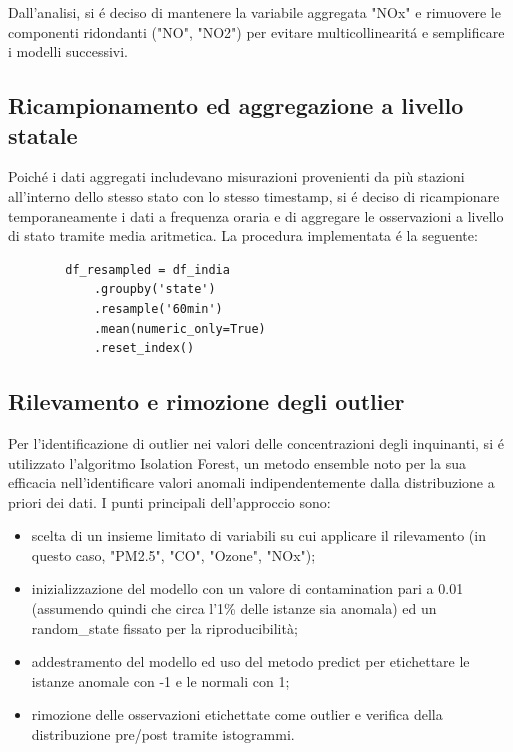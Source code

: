 \documentclass[a4paper,12pt]{report}
\begin{document}
	Dall'analisi, si é deciso di mantenere la variabile aggregata "NOx" e rimuovere le componenti ridondanti ("NO", "NO2") per evitare multicollinearitá e semplificare i modelli successivi.
	
	\subsection{Ricampionamento ed aggregazione a livello statale}
	Poiché i dati aggregati includevano misurazioni provenienti da più stazioni all'interno dello stesso stato con lo stesso timestamp, si é deciso di ricampionare temporaneamente i dati a frequenza oraria e di aggregare le osservazioni a livello di stato tramite media aritmetica. La procedura implementata é la seguente:
	
	\begin{verbatim}
		df_resampled = df_india
			.groupby('state')
			.resample('60min')
			.mean(numeric_only=True)
			.reset_index()
	\end{verbatim}
	
	\subsection{Rilevamento e rimozione degli outlier}
	Per l'identificazione di outlier nei valori delle concentrazioni degli inquinanti, si é utilizzato l'algoritmo Isolation Forest, un metodo ensemble noto per la sua efficacia nell'identificare valori anomali indipendentemente dalla distribuzione a priori dei dati. I punti principali dell'approccio sono:
	
	\begin{itemize}
		\item scelta di un insieme limitato di variabili su cui applicare il rilevamento (in questo caso, "PM2.5", "CO", "Ozone", "NOx");
		\item inizializzazione del modello con un valore di contamination pari a 0.01 (assumendo quindi che circa l'1\% delle istanze sia anomala) ed un random\_state fissato per la riproducibilità;
		\item addestramento del modello ed uso del metodo predict per etichettare le istanze anomale con -1 e le normali con 1;
		\item rimozione delle osservazioni etichettate come outlier e verifica della distribuzione pre/post tramite istogrammi.
	\end{itemize}
	
\end{document}
